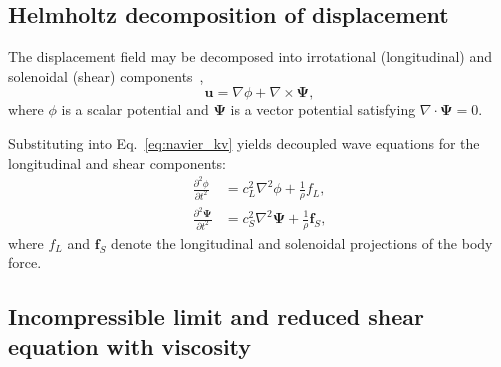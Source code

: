 \documentclass{iopjournal}
\begin{document}
\subsection{Helmholtz decomposition of displacement}

The displacement field may be decomposed into irrotational (longitudinal) and
solenoidal (shear)
components~\cite{auld1973acoustic,graff1991wave},
\begin{equation}
\mathbf{u} = \nabla \phi + \nabla \times \mathbf{\Psi},
\end{equation}
where $\phi$ is a scalar potential and $\mathbf{\Psi}$ is a vector potential
satisfying $\nabla \cdot \mathbf{\Psi} = 0$.

Substituting into Eq.~\eqref{eq:navier_kv} yields decoupled wave equations for
the longitudinal and shear components:
\begin{align}
\frac{\partial^2 \phi}{\partial t^2} &= c_L^2 \nabla^2 \phi + \frac{1}{\rho} f_L,
\\
\frac{\partial^2 \mathbf{\Psi}}{\partial t^2} &= c_S^2 \nabla^2 \mathbf{\Psi} + \frac{1}{\rho} \mathbf{f}_S,
\end{align}
where $f_L$ and $\mathbf{f}_S$ denote the longitudinal and solenoidal
projections of the body force.

\subsection{Incompressible limit and reduced shear equation with viscosity}
\label{sec:incompressible_limit}
\end{document}

